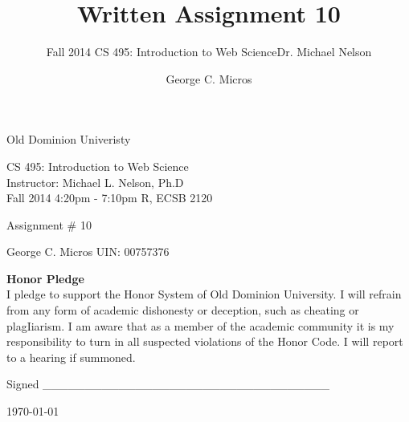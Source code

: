 \documentclass[]{svmono}
\begin{document}
\begin{titlepage}    
\begin{center}
\vspace*{0in}
\huge{\sc  Old Dominion Univeristy\\  }



\vspace{1in}
\Large{\sc CS 495: Introduction to Web Science \\ Instructor: Michael L. Nelson, Ph.D \\ Fall 2014 4:20pm - 7:10pm R, ECSB 2120\\}

\vspace{1in}
\Large{Assignment \# 10\\}

\vspace{.5cm}
\Large{ \sc George C.  Micros  UIN: 00757376\\ }



\vspace {7cm}

{\large \bf {Honor Pledge}}\\
{I pledge to support the Honor System of Old Dominion University. I will refrain from any form of academic dishonesty or deception, such as cheating or plagIiarism. I am aware that as a member of the academic community it is my responsibility to turn in all suspected violations of the Honor Code. I will report to a hearing if summoned. }\\
\vspace {.5cm}

{Signed \_\_\_\_\_\_\_\_\_\_\_\_\_\_\_\_\_\_\_\_\_\_\_\_\_\_\_\_\_\_\_\_\_\_}


\today
\end{center}
\end{titlepage}




\author{George C. Micros}
\title{Written Assignment 10}
\subtitle{Fall 2014 \newline  CS 495: Introduction to Web Science\newline Dr. Michael Nelson}
\maketitle


\tableofcontents
\end{document}

